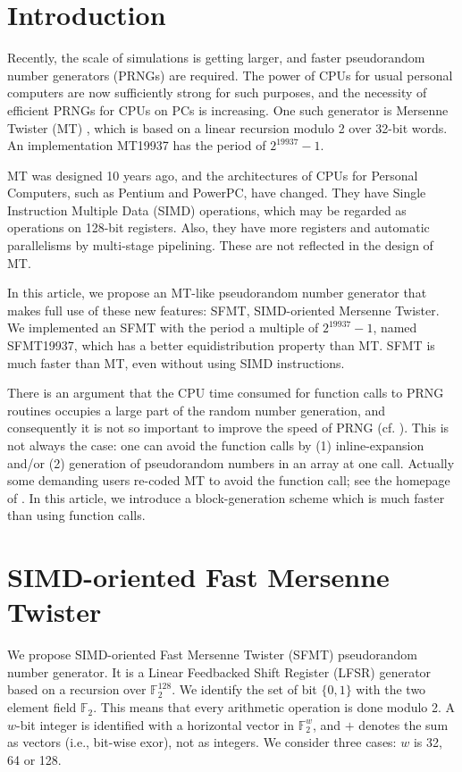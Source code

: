 \documentclass{svmult}
\def\F2{{\mathbb F}_2}
\begin{document}
\section{Introduction}
Recently, the scale of simulations is getting larger,
and faster pseudorandom number generators (PRNGs)
are required. The power of CPUs for
usual personal computers are now sufficiently strong
for such purposes, and the necessity of efficient PRNGs 
for CPUs on PCs is increasing.
One such generator is Mersenne Twister (MT) \cite{MT},
which is based on a linear recursion modulo 2 over 32-bit
words. An implementation MT19937 has 
the period of $2^{19937}-1$.

MT was designed 10 years ago,
and the architectures of CPUs for Personal Computers,
such as Pentium and PowerPC, have changed.
They have
Single Instruction Multiple Data (SIMD) operations,
which may be regarded as operations 
on 128-bit registers. Also, they have more registers
and automatic parallelisms by multi-stage pipelining. 
These are not reflected in the design of MT. 

In this article, we propose an MT-like 
pseudorandom number generator
that makes full use of these new features: SFMT, 
SIMD-oriented Mersenne Twister. 
We implemented an SFMT with the period a multiple of $2^{19937}-1$, named
SFMT19937,
which has a better equidistribution property than MT. 
SFMT is much faster than MT, even without using SIMD instructions. 

There is an argument that the CPU time consumed for 
function calls to PRNG routines occupies a large part of
the random number generation, and consequently 
it is not so important to improve the speed of PRNG 
(cf. \cite{XORSHIFT}).
This is not always the case: 
one can avoid the function calls by (1) inline-expansion
and/or (2) generation of pseudorandom numbers in an array
at one call. Actually some demanding users re-coded MT to avoid the 
function call; see the homepage of \cite{MT}. 
In this article, we introduce a block-generation scheme which 
is much faster than using function calls.

\section{SIMD-oriented Fast Mersenne Twister}\label{sec:jump}

We propose SIMD-oriented Fast Mersenne Twister (SFMT) 
pseudorandom number generator. It is a
Linear Feedbacked Shift Register (LFSR) generator based
on a recursion over $\F2^{128}$.
We identify
the set of bit $\{0,1\}$
with the two element field $\F2$. This means that
every arithmetic operation is done modulo 2. 
A $w$-bit integer is identified with 
a horizontal vector in $\F2^{w}$, and 
$+$ denotes the sum as vectors (i.e., 
bit-wise exor), not as integers.
We consider three cases: $w$ is 32, 64 or 128.
\end{document}
